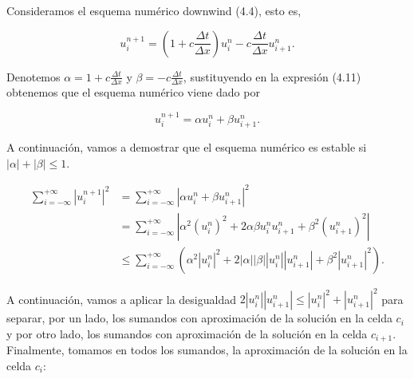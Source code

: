 \begin{example}
  Consideramos el esquema numérico downwind (4.4), esto es,

  \begin{equation*}
    u^{n+1}_{i}=
    \left(
    1+
    c\frac{\Delta t}{\Delta x}
    \right)
    u^{n}_{i}-
    c\frac{\Delta t}{\Delta x}
    u^{n}_{i+1}.
  \end{equation*}

  Denotemos
  \begin{math}
    \alpha=
    1+
    c\frac{\Delta t}{\Delta x}
  \end{math}
  y
  \begin{math}
    \beta=
    -c\frac{\Delta t}{\Delta x}
  \end{math},
  sustituyendo en la expresión (4.11) obtenemos que el esquema
  numérico viene dado por

  \begin{equation*}
    u^{n+1}_{i}=
    \alpha u^{n}_{i}+
    \beta u^{n}_{i+1}.
  \end{equation*}

  A continuación, vamos a demostrar que el esquema numérico es estable si
  \begin{math}
    \left|\alpha\right|+
    \left|\beta\right|\leq
    1
  \end{math}.

  \begin{align*}
    \sum_{i=-\infty}^{+\infty}
    {\left|u^{n+1}_{i}\right|}^{2} & =
    \sum_{i=-\infty}^{+\infty}
    {\left|\alpha u^{n}_{i}+\beta u^{n}_{i+1}\right|}^{2} \\
                                   & =
    \sum_{i=-\infty}^{+\infty}
    \left|
    \alpha^{2}
    {\left(u^{n}_{i}\right)}^{2}+
    2\alpha\beta
    u^{n}_{i}
    u^{n}_{i+1}+
    \beta^{2}
    {\left(u^{n}_{i+1}\right)}^{2}
    \right|                                               \\
                                   & \leq
    \sum_{i=-\infty}^{+\infty}
    \left(
    \alpha^{2}
    {\left|u^{n}_{i}\right|}^{2}+
    2\left|\alpha\right|
    \left|\beta\right|
    \left|u^{n}_{i}\right|
    \left|u^{n}_{i+1}\right|+
    \beta^{2}
    {\left|u^{n}_{i+1}\right|}^{2}
    \right).
  \end{align*}

  A continuación, vamos a aplicar la desigualdad
  \begin{math}
    2
    \left|u^{n}_{i}\right|
    \left|u^{n}_{i+1}\right|\leq
    {\left|u^{n}_{i}\right|}^{2}+
    {\left|u^{n}_{i+1}\right|}^{2}
  \end{math}
  para separar, por un lado, los sumandos con aproximación de la
  solución en la celda $c_{i}$ y por otro lado, los sumandos con
  aproximación de la solución en la celda $c_{i+1}$.
  Finalmente, tomamos en todos los sumandos, la aproximación de la
  solución en la celda $c_{i}$:


\end{example}
